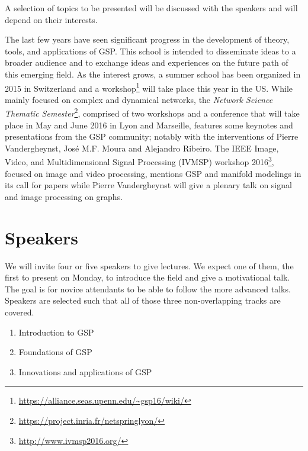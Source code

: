\documentclass[a4paper]{scrartcl}
\begin{document}
A selection of topics to be presented will be discussed with the speakers and
will depend on their interests.

The last few years have seen significant progress in the development of theory,
tools, and applications of GSP. This school is intended to disseminate ideas to
a broader audience and to exchange ideas and experiences on the future path of
this emerging field.  As the interest grows, a summer school has been organized
in 2015 in Switzerland and a
workshop\footnote{\url{https://alliance.seas.upenn.edu/~gsp16/wiki/}} will take
place this year in the US.  While mainly focused on complex and dynamical
networks, the \textit{Network Science Thematic
Semester}\footnote{\url{https://project.inria.fr/netspringlyon/}}, comprised of
two workshops and a conference that will take place in May and June 2016 in Lyon
and Marseille, features some keynotes and presentations from the GSP community;
notably with the interventions of Pierre Vandergheynst, José M.F. Moura and
Alejandro Ribeiro.  The IEEE Image, Video, and Multidimensional Signal
Processing (IVMSP) workshop 2016\footnote{\url{http://www.ivmsp2016.org/}},
focused on image and video processing, mentions GSP and manifold modelings in
its call for papers while Pierre Vandergheynst will give a plenary talk on
signal and image processing on graphs.

\section{Speakers}

We will invite four or five speakers to give lectures. We expect one of them,
the first to present on Monday, to introduce the field and give a motivational
talk. The goal is for novice attendants to be able to follow the more advanced
talks. Speakers are selected such that all of those three non-overlapping tracks
are covered.
\begin{enumerate}
	\setlength{\itemsep}{0pt} \setlength{\parskip}{0pt}
	\item Introduction to GSP
	\item Foundations of GSP
	\item Innovations and applications of GSP
\end{enumerate} 
\end{document}
